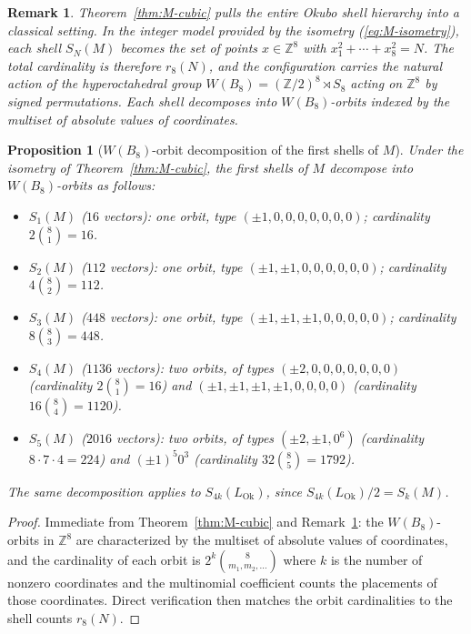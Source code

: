 \documentclass{birkjour}
\newtheorem{proposition}[theorem]{Proposition}
\newtheorem{remark}[theorem]{Remark}
\newcommand{\LOk}{L_{\mathrm{Ok}}}
\newcommand{\ZZ}{\mathbb Z}
\numberwithin{equation}{section}
\begin{document}
\begin{remark}
\label{rem:cubic-consequence}
Theorem~\ref{thm:M-cubic} pulls the entire Okubo shell hierarchy into a
classical setting. In the integer model provided by the isometry
(\ref{eq:M-isometry}), each shell \(S_N(M)\) becomes the set of points
\(x\in\ZZ^8\) with \(x_1^2+\cdots+x_8^2=N\). The total cardinality is therefore
\(r_8(N)\), and the configuration carries the natural action of the
hyperoctahedral group \(W(B_8)=(\ZZ/2)^8\rtimes S_8\) acting on \(\ZZ^8\) by
signed permutations. Each shell decomposes into \(W(B_8)\)-orbits indexed by the
multiset of absolute values of coordinates.
\end{remark}

\begin{proposition}[\(W(B_8)\)-orbit decomposition of the first shells of \(M\)]
\label{prop:WB8-orbits}
Under the isometry of Theorem~\ref{thm:M-cubic}, the first shells of \(M\)
decompose into \(W(B_8)\)-orbits as follows:
\begin{itemize}
\item \(S_1(M)\) (\(16\) vectors): one orbit, type
  \((\pm1,0,0,0,0,0,0,0)\); cardinality \(2\binom{8}{1}=16\).
\item \(S_2(M)\) (\(112\) vectors): one orbit, type
  \((\pm1,\pm1,0,0,0,0,0,0)\); cardinality \(4\binom{8}{2}=112\).
\item \(S_3(M)\) (\(448\) vectors): one orbit, type
  \((\pm1,\pm1,\pm1,0,0,0,0,0)\); cardinality \(8\binom{8}{3}=448\).
\item \(S_4(M)\) (\(1136\) vectors): two orbits, of types
  \((\pm2,0,0,0,0,0,0,0)\) (cardinality \(2\binom{8}{1}=16\)) and
  \((\pm1,\pm1,\pm1,\pm1,0,0,0,0)\) (cardinality \(16\binom{8}{4}=1120\)).
\item \(S_5(M)\) (\(2016\) vectors): two orbits, of types
  \((\pm2,\pm1,0^6)\) (cardinality \(8\cdot 7\cdot 4=224\)) and
  \((\pm1)^5 0^3\) (cardinality \(32\binom{8}{5}=1792\)).
\end{itemize}
The same decomposition applies to \(S_{4k}(\LOk)\), since
\(S_{4k}(\LOk)/2=S_k(M)\).
\end{proposition}

\begin{proof}
Immediate from Theorem~\ref{thm:M-cubic} and Remark~\ref{rem:cubic-consequence}:
the \(W(B_8)\)-orbits in \(\ZZ^8\) are characterized by the multiset of absolute
values of coordinates, and the cardinality of each orbit is
\(2^k\binom{8}{m_1,m_2,\ldots}\) where \(k\) is the number of nonzero
coordinates and the multinomial coefficient counts the placements of those
coordinates. Direct verification then matches the orbit cardinalities to the
shell counts \(r_8(N)\).
\end{proof}
\end{document}
